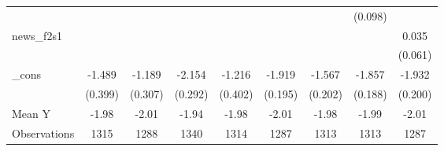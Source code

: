 {\begin{tabular}{l*{8}{c}}
            &                     &                     &                     &                     &                     &                     &     (0.098)         &                     \\
\addlinespace
news\_f2s1   &                     &                     &                     &                     &                     &                     &                     &       0.035         \\
            &                     &                     &                     &                     &                     &                     &                     &     (0.061)         \\
\addlinespace
\_cons      &      -1.489\sym{***}&      -1.189\sym{***}&      -2.154\sym{***}&      -1.216\sym{***}&      -1.919\sym{***}&      -1.567\sym{***}&      -1.857\sym{***}&      -1.932\sym{***}\\
            &     (0.399)         &     (0.307)         &     (0.292)         &     (0.402)         &     (0.195)         &     (0.202)         &     (0.188)         &     (0.200)         \\
\midrule
Mean Y      &       -1.98         &       -2.01         &       -1.94         &       -1.98         &       -2.01         &       -1.98         &       -1.99         &       -2.01         \\
Observations&        1315         &        1288         &        1340         &        1314         &        1287         &        1313         &        1313         &        1287         \\
\bottomrule
\end{tabular}
}
